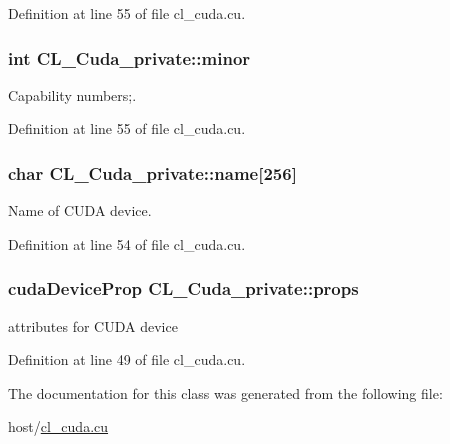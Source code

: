 Definition at line 55 of file cl\_\-cuda.cu.\hypertarget{classCL__Cuda__private_a7b640660cd0e6b853d6a1e8d57d9f9dc}{
\subsubsection[{minor}]{\setlength{\rightskip}{0pt plus 5cm}int {\bf CL\_\-Cuda\_\-private::minor}}}
\label{classCL__Cuda__private_a7b640660cd0e6b853d6a1e8d57d9f9dc}


Capability numbers;. 

Definition at line 55 of file cl\_\-cuda.cu.\hypertarget{classCL__Cuda__private_a3f0394a7cd0f0e7542e9f33252eca8b6}{
\subsubsection[{name}]{\setlength{\rightskip}{0pt plus 5cm}char {\bf CL\_\-Cuda\_\-private::name}\mbox{[}256\mbox{]}}}
\label{classCL__Cuda__private_a3f0394a7cd0f0e7542e9f33252eca8b6}


Name of CUDA device. 

Definition at line 54 of file cl\_\-cuda.cu.\hypertarget{classCL__Cuda__private_ad7b57a953847c106179d0b0504111fb3}{
\subsubsection[{props}]{\setlength{\rightskip}{0pt plus 5cm}cudaDeviceProp {\bf CL\_\-Cuda\_\-private::props}}}
\label{classCL__Cuda__private_ad7b57a953847c106179d0b0504111fb3}


attributes for CUDA device 

Definition at line 49 of file cl\_\-cuda.cu.

The documentation for this class was generated from the following file:\begin{DoxyCompactItemize}
\item 
host/\hyperlink{cl__cuda_8cu}{cl\_\-cuda.cu}\end{DoxyCompactItemize}

